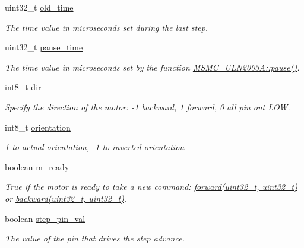 \begin{DoxyCompactItemize}
uint32\+\_\+t \hyperlink{class_m_s_m_c___a4988_a60ff02342382a71526d14fb9e51ddc2a}{old\+\_\+time}
\begin{DoxyCompactList}\small\item\em The time value in microseconds set during the last step. \end{DoxyCompactList}\item 
uint32\+\_\+t \hyperlink{class_m_s_m_c___a4988_a3c4854c40c6d9db5e37698eea2debd70}{pause\+\_\+time}
\begin{DoxyCompactList}\small\item\em The time value in microseconds set by the function \hyperlink{class_m_s_m_c___u_l_n2003_a_aa1d3444465d59ca6c87f05f565dde4a2}{M\+S\+M\+C\+\_\+\+U\+L\+N2003\+A\+::pause()}. \end{DoxyCompactList}\item 
int8\+\_\+t \hyperlink{class_m_s_m_c___a4988_a887a3d29966bdfc0d920d339b83e5346}{dir}
\begin{DoxyCompactList}\small\item\em Specify the direction of the motor\+: -\/1 backward, 1 forward, 0 all pin out L\+O\+W. \end{DoxyCompactList}\item 
int8\+\_\+t \hyperlink{class_m_s_m_c___a4988_a81bb2d2035011573f68c7a2c66bc5bc2}{orientation}
\begin{DoxyCompactList}\small\item\em 1 to actual orientation, -\/1 to inverted orientation \end{DoxyCompactList}\item 
boolean \hyperlink{class_m_s_m_c___a4988_a86ef4c886ee6c7ed6fa87e27c0a7a9ea}{m\+\_\+ready}
\begin{DoxyCompactList}\small\item\em True if the motor is ready to take a new command\+: \hyperlink{class_m_s_m_c___a4988_a9acdbabf546656a6436e89579e8fcfca}{forward(uint32\+\_\+t, uint32\+\_\+t)} or \hyperlink{class_m_s_m_c___a4988_a836bed9e28e723ead2a94446bb704869}{backward(uint32\+\_\+t, uint32\+\_\+t)}. \end{DoxyCompactList}\item 
boolean \hyperlink{class_m_s_m_c___a4988_a1ec86b6286b8827eca6d5703a02f65fd}{step\+\_\+pin\+\_\+val}
\begin{DoxyCompactList}\small\item\em The value of the pin that drives the step advance. \end{DoxyCompactList}\item 

\end{DoxyCompactItemize}
